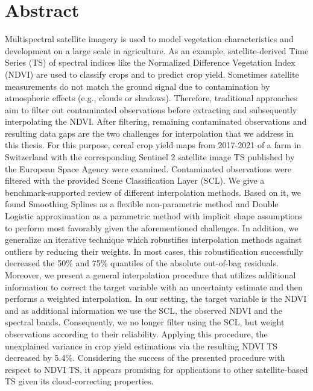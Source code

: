 \chapter*{Abstract}

Multispectral satellite imagery is used to model vegetation characteristics and development on a large scale in agriculture. As an example, satellite-derived Time Series (TS) of spectral indices like the Normalized Difference Vegetation Index (NDVI) are used to classify crops and to predict crop yield. 
Sometimes satellite measurements do not match the ground signal due to contamination by atmospheric effects (e.g., clouds or shadows). Therefore, traditional approaches aim to filter out contaminated observations before extracting and subsequently interpolating the NDVI. After filtering, remaining contaminated observations and resulting data gaps are the two challenges for interpolation that we address in this thesis.
For this purpose, cereal crop yield maps from 2017-2021 of a farm in Switzerland with the corresponding Sentinel 2 satellite image TS published by the European Space Agency were examined. Contaminated observations were filtered with the provided Scene Classification Layer (SCL). 
We give a benchmark-supported review of different interpolation methods. Based on it, we found Smoothing Splines as a flexible non-parametric method and Double Logistic approximation as a parametric method with implicit shape assumptions to perform most favorably given the aforementioned challenges. In addition, we generalize an iterative technique which robustifies interpolation methods against outliers by reducing their weights. In most cases, this robustification successfully decreased the 50\% and 75\% quantiles of the absolute out-of-bag residuals. 
Moreover, we present a general interpolation procedure that utilizes additional information to correct the target variable with an uncertainty estimate and then performs a weighted interpolation. In our setting, the target variable is the NDVI and as additional information we use the SCL, the observed NDVI and the spectral bands. Consequently, we no longer filter using the SCL, but weight observations according to their reliability. %
Applying this procedure, the unexplained variance in crop yield estimations via the resulting NDVI TS decreased by 5.4\%. 
Considering the success of the presented procedure with respect to NDVI TS, it appears promising for applications to other satellite-based TS given its cloud-correcting properties.

